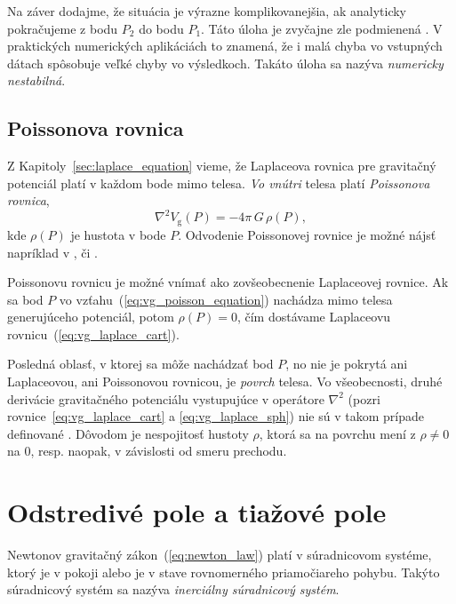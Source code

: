 \documentclass[a4paper, 12pt]{book}
\newcommand{\gidx}{\mathrm g}
\begin{document}
Na záver dodajme, že situácia je výrazne komplikovanejšia, ak analyticky 
pokračujeme z bodu $P_2$ do bodu $P_1$.  Táto úloha je zvyčajne zle podmienená 
\citep{SansoGeodeticBoundaryValueProblem}.  V praktických numerických 
aplikáciách to znamená, že i malá chyba vo vstupných dátach spôsobuje veľké 
chyby vo výsledkoch.  Takáto úloha sa nazýva \emph{numericky nestabilná}.  






\subsection{Poissonova rovnica}
\label{sec:poisson_equation}

Z Kapitoly~\ref{sec:laplace_equation} vieme, že Laplaceova rovnica pre 
gravitačný potenciál platí v každom bode mimo telesa.  \emph{Vo vnútri} telesa 
platí \emph{Poissonova rovnica},
%
\begin{equation}
\label{eq:vg_poisson_equation}
\nabla^2 V_\gidx(P) = -4 \pi \, G \, \rho(P){,}
\end{equation}
%
kde $\rho(P)$ je hustota v bode $P$.  Odvodenie Poissonovej rovnice je možné 
nájsť napríklad v \cite{MacMillan1930}, \cite{Kellogg1967} či 
\cite{SansoGeoidDetermination}.

Poissonovu rovnicu je možné vnímať ako zovšeobecnenie Laplaceovej rovnice.  Ak 
sa bod $P$ vo vzťahu~(\ref{eq:vg_poisson_equation}) nachádza mimo telesa 
generujúceho potenciál, potom $\rho(P) = 0$, čím dostávame Laplaceovu 
rovnicu~(\ref{eq:vg_laplace_cart}).

Posledná oblasť, v ktorej sa môže nachádzať bod $P$, no nie je pokrytá ani 
Laplaceovou, ani Poissonovou rovnicou, je \emph{povrch} telesa.  Vo 
všeobecnosti, druhé derivácie gravitačného potenciálu vystupujúce v operátore 
$\nabla^2$ (pozri rovnice~\ref{eq:vg_laplace_cart} a \ref{eq:vg_laplace_sph}) 
nie sú v takom prípade definované \citep{Kellogg1967}.  Dôvodom je nespojitosť 
hustoty $\rho$, ktorá sa na povrchu mení z $\rho \neq 0$ na 0, resp. naopak, 
v závislosti od smeru prechodu.






\section{Odstredivé pole a tiažové pole}
\label{sec:centrifugal_gravity_field}

Newtonov gravitačný zákon~(\ref{eq:newton_law}) platí v súradnicovom systéme, 
ktorý je v pokoji alebo je v stave rovnomerného priamočiareho pohybu.  Takýto 
súradnicový systém sa nazýva \emph{inerciálny súradnicový systém}.
\end{document}
